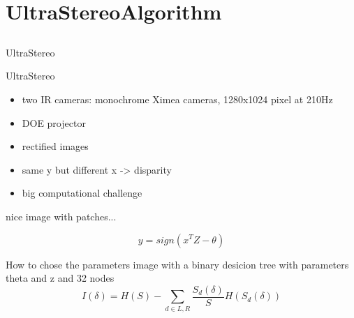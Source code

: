 %
%
\section{UltraStereoAlgorithm}
\subsection{}
\begin{frame}{UltraStereo}
\end{frame}

\begin{frame}{UltraStereo}
\begin{itemize}
\item two IR cameras: monochrome Ximea cameras, 1280x1024 pixel at 210Hz
\item DOE projector
\item rectified images 
\item same y but different x -> disparity
\item big computational challenge
\end{itemize}
\end{frame}

\begin{frame}
nice image with patches...
\end{frame}

\begin{frame}
\begin{equation}
y = sign(x^{T} Z-\theta)
\end{equation}
\end{frame}

\begin {frame}{How to chose the parameters}
image with a binary desicion tree with parameters theta and z and 32 nodes
\begin{equation}
I(\delta) = H(S) -\sum_{d\in L,R} \frac{S_{d}(\delta)}{S} H(S_{d}(\delta))
\end{equation}
\end{frame}
